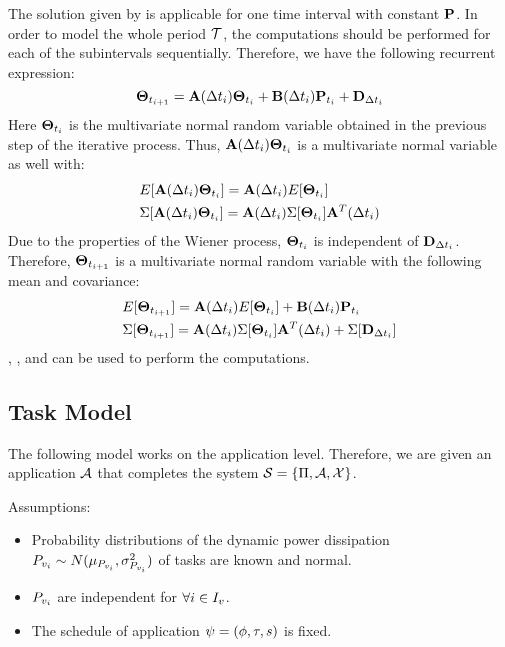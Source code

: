 The solution given by  is applicable for one time interval with constant $\mathbf{P}$. In order to model the whole period $\mathcal{T}$, the computations should be performed for each of the subintervals sequentially. Therefore, we have the following recurrent expression:
\begin{equation} \equlabel{recurrence}
  \vtemperature_{\time_{i + 1}} = \m{A}(\timeinterval_i) \vtemperature_{\time_i} + \m{B}(\timeinterval_i) \vpower_{\time_i} + \m{D}_{\timeinterval_i}
\end{equation}
Here $\mathbf{\Theta}_{t_i}$ is the multivariate normal random variable obtained in the previous step of the iterative process. Thus, $\mathbf{A}(\Delta t_i) \mathbf{\Theta}_{t_i}$ is a multivariate normal variable as well with:
\begin{align*}
  & E[\mathbf{A}(\Delta t_i) \mathbf{\Theta}_{t_i}] = \mathbf{A}(\Delta t_i)E[\mathbf{\Theta}_{t_i}] \\
  & \Sigma[\mathbf{A}(\Delta t_i) \mathbf{\Theta}_{t_i}] = \mathbf{A}(\Delta t_i) \Sigma[\mathbf{\Theta}_{t_i}] \mathbf{A}^T(\Delta t_i)
\end{align*}
Due to the properties of the Wiener process, $\mathbf{\Theta}_{t_i}$ is independent of $\mathbf{D}_{\Delta t_i}$. Therefore, $\mathbf{\Theta}_{t_{i+1}}$ is a multivariate normal random variable with the following mean and covariance:
\begin{align*}
  & E[\mathbf{\Theta}_{t_{i+1}}] = \mathbf{A}(\Delta t_i)E[\mathbf{\Theta}_{t_i}] + \mathbf{B}(\Delta t_i) \mathbf{P}_{t_i} \\
  & \Sigma[\mathbf{\Theta}_{t_{i+1}}] = \mathbf{A}(\Delta t_i) \Sigma[\mathbf{\Theta}_{t_i}] \mathbf{A}^T(\Delta t_i) + \Sigma[\mathbf{D}_{\Delta t_i}]
\end{align*}
, , and  can be used to perform the computations.

\subsection{Task Model} 
The following model works on the application level. Therefore, we are given an application $\mathcal{A}$ that completes the system $\mathcal{S} = \{ \Pi, \mathcal{A}, \mathcal{X} \}$.

Assumptions:
\begin{itemize}
  \item Probability distributions of the dynamic power dissipation $P_{v_i} \sim N(\mu_{P_{v_i}}, \sigma_{P_{v_i}}^2)$ of tasks are known and normal.
  \item $P_{v_i}$ are independent for $\forall i \in I_v$.
  \item The schedule of application $\psi = (\phi, \tau, s)$ is fixed.
\end{itemize}

